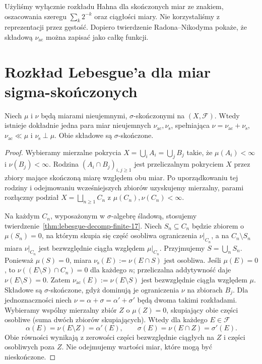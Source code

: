 \begin{uwaga}
Użyliśmy wyłącznie rozkładu Hahna dla skończonych miar ze
znakiem, oszacowania szeregu $\sum_k2^{-k}$ oraz ciągłości
miary. Nie korzystaliśmy z reprezentacji przez gęstość.
Dopiero twierdzenie Radona--Nikodyma pokaże, że składową
$\nu_{\mathrm{ac}}$ można zapisać jako całkę funkcji.
\end{uwaga}

\section{Rozkład Lebesgue'a dla miar sigma-skończonych}
\begin{twierdzenie}
\label{thm:lebesgue-decomp-sigfin-17}
Niech $\mu$ i $\nu$ będą miarami nieujemnymi,
$\sigma$-skończonymi na $(X,\mathcal F)$.
Wtedy istnieje dokładnie jedna para miar nieujemnych
$\nu_{\mathrm{ac}},\nu_{\mathrm{s}}$, spełniająca
$\nu=\nu_{\mathrm{ac}}+\nu_{\mathrm{s}}$,
$\nu_{\mathrm{ac}}\ll\mu$ i $\nu_{\mathrm{s}}\perp\mu$.
Obie składowe są $\sigma$-skończone.
\end{twierdzenie}
\begin{proof}
Wybieramy mierzalne pokrycia
$X=\bigcup_iA_i=\bigcup_jB_j$ takie, że
$\mu(A_i)<\infty$ i $\nu(B_j)<\infty$.
Rodzina $(A_i\cap B_j)_{i,j\ge1}$ jest przeliczalnym
pokryciem $X$ przez zbiory mające skończoną miarę
względem obu miar. Po uporządkowaniu tej rodziny
i odejmowaniu wcześniejszych zbiorów uzyskujemy
mierzalny, parami rozłączny podział $X=\bigsqcup_{n\ge1}C_n$
z $\mu(C_n),\nu(C_n)<\infty$.

Na każdym $C_n$, wyposażonym w $\sigma$-algebrę śladową,
stosujemy twierdzenie~\ref{thm:lebesgue-decomp-finite-17}.
Niech $S_n\subseteq C_n$ będzie zbiorem o
$\mu(S_n)=0$, na którym skupia się część osobliwa
ograniczenia $\nu|_{C_n}$, a na $C_n\setminus S_n$
miara $\nu|_{C_n}$ jest bezwzględnie ciągła względem
$\mu|_{C_n}$. Przyjmujemy $S=\bigcup_nS_n$.
Ponieważ $\mu(S)=0$, miara
$\nu_{\mathrm{s}}(E):=\nu(E\cap S)$ jest osobliwa.
Jeśli $\mu(E)=0$, to
$\nu((E\setminus S)\cap C_n)=0$ dla każdego $n$;
przeliczalna addytywność daje $\nu(E\setminus S)=0$.
Zatem $\nu_{\mathrm{ac}}(E):=\nu(E\setminus S)$
jest bezwzględnie ciągła względem $\mu$.
Składowe są $\sigma$-skończone, gdyż dominują je
ograniczenia $\nu$ na zbiorach $B_j$.
Dla jednoznaczności niech $\nu=\alpha+\sigma=\alpha'+\sigma'$
będą dwoma takimi rozkładami. Wybieramy wspólny mierzalny
zbiór $Z$ o $\mu(Z)=0$, skupiający obie części osobliwe
(suma dwóch zbiorów skupiających). Wtedy dla każdego $E\in\mathcal F$
\[
 \alpha(E)=\nu(E\setminus Z)=\alpha'(E),\qquad
 \sigma(E)=\nu(E\cap Z)=\sigma'(E).
\]
Obie równości wynikają z zerowości części bezwzględnie ciągłych
na $Z$ i części osobliwych poza $Z$. Nie odejmujemy wartości
miar, które mogą być nieskończone.
\end{proof}

